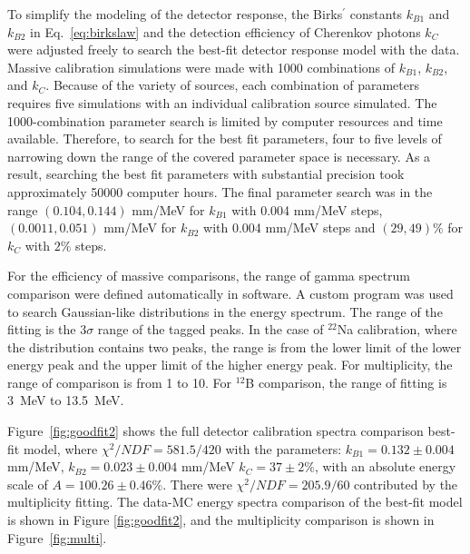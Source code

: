 To simplify the modeling of the detector response, the Birks$^\prime$ constants $k_{B1}$ and $k_{B2}$ in Eq.~\ref{eq:birkslaw} and the detection efficiency of Cherenkov photons $k_C$ were adjusted freely to search the best-fit detector response model with the data. 
Massive calibration simulations were made with 1000 combinations of $k_{B1}$, $k_{B2}$, and $k_C$.
Because of the variety of sources, each combination of parameters requires five simulations with an individual calibration source simulated.
The 1000-combination parameter search is limited by computer resources and time available.
Therefore, to search for the best fit parameters, four to five levels of narrowing down the range of the covered parameter space is necessary.
As a result, searching the best fit parameters with substantial precision took approximately 50000 computer hours. 
The final parameter search was in the range $(0.104, 0.144)$ mm/MeV for $k_{B1}$ with 0.004 mm/MeV steps, $(0.0011, 0.051)$ mm/MeV for $k_{B2}$ with 0.004 mm/MeV steps and $(29, 49)\%$ for $k_C$ with $2\%$ steps. 

For the efficiency of massive comparisons, the range of gamma spectrum comparison were defined automatically in software. 
A custom program was used to search Gaussian-like distributions in the energy spectrum.
The range of the fitting is the $3\sigma$ range of the tagged peaks.
In the case of $^{22}$Na calibration, where the distribution contains two peaks, the range is from the lower limit of the lower energy peak and the upper limit of the higher energy peak.
For multiplicity, the range of comparison is from 1 to 10.
For $^{12}$B comparison, the range of fitting is 3~MeV to 13.5~MeV.

Figure~\ref{fig:goodfit2} shows the full detector calibration spectra comparison best-fit model, where $\chi^2/NDF = 581.5/420$ with the parameters: $k_{B1} = 0.132 \pm 0.004$ mm/MeV, $k_{B2} = 0.023 \pm 0.004$ mm/MeV $k_C = 37 \pm 2\%$, with an absolute energy scale of $A = 100.26\pm0.46\%$. 
There were $\chi^2/NDF = 205.9/60$ contributed by the multiplicity fitting.
The data-MC energy spectra comparison of the best-fit model is shown in Figure \ref{fig:goodfit2}, and the multiplicity comparison is shown in Figure~\ref{fig:multi}.

